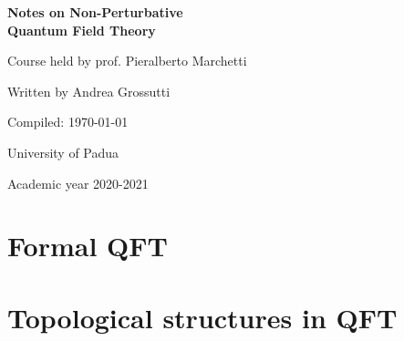 \documentclass[a4paper]{report}
\newcommand{\onlyinsubfile}[1]{#1}
\newcommand{\onlyinmainfile}[1]{

\skipline

\textsf{\color{red} Part of the text is omitted from the compiled subfile, in order to make the compilation faster. You can find it in the main file. To avoid this, remove `` \textnormal{\textbackslash onlyinmainfile\{\ldots\}}'' from the code.}

\skipline

}
\begin{document}
\renewcommand{\onlyinsubfile}[1]{}
\renewcommand{\onlyinmainfile}[1]{#1}

\begin{titlepage}
\begin{center}
       \vspace*{5cm}
       \textbf{\Huge Notes on Non-Perturbative\\[0.3em]
       Quantum Field Theory}
       
       \vspace{1cm}
        {\LARGE Course held by prof. Pieralberto Marchetti}
        
        \vspace{1.5cm}
        {\Large Written by Andrea Grossutti}   
                 
       \vfill
       {\large Compiled: \today} 
           
       \vspace{2cm}        
       {\large University of Padua}  
        
       \vspace{0.8cm}
       {\large Academic year 2020-2021}
\end{center}
\end{titlepage}

\tableofcontents

\part{Formal QFT}





\part{Topological structures in QFT}



\nocite{*}
\printbibliography
\end{document}
